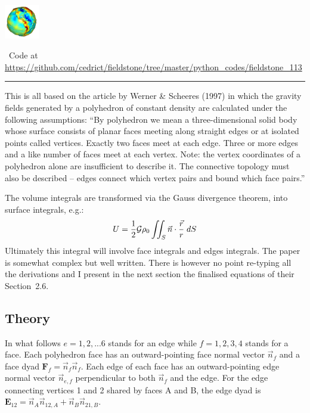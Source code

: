 
\includegraphics[height=1.5cm]{images/pictograms/gravity}



\begin{center}
\inpython~Code at \url{https://github.com/cedrict/fieldstone/tree/master/python_codes/fieldstone_113}
\end{center}

\par\noindent\rule{\textwidth}{0.4pt}



This is all based on the article by Werner \& Scheeres (1997) \cite{wesc97} in which 
the gravity fields generated by a polyhedron 
of constant density are calculated under the following assumptions:
``By polyhedron we mean a three-dimensional solid body whose surface consists of planar faces 
meeting along straight edges or at isolated points called vertices. Exactly two faces meet 
at each edge. Three or more edges and a like number of faces meet at each vertex. Note: 
the vertex coordinates of a polyhedron alone are insufficient to describe it. The connective 
topology must also be described -- edges connect which vertex pairs and bound which face pairs.''

The volume integrals are transformed via the Gauss divergence theorem, into surface integrals, e.g.:
\[
U = \frac12 {\cal G} \rho_0 \iint_S \vec{n} \cdot \frac{\vec{r}}{r} \; dS
\]
Ultimately this integral will involve face integrals and edges integrals.
The paper is somewhat complex but well written. There is however no point re-typing all the derivations and I present in the next section the finalised equations of their Section~2.6.


\subsection*{Theory}


In what follows $e=1,2,...6$ stands for an edge while $f=1,2,3,4$ stands
for a face. 
Each polyhedron face has an outward-pointing face normal vector $\vec{n}_f$
and a face dyad ${\bm F}_f =\vec{n}_f\vec{n}_f $.
Each edge of each face has an outward-pointing edge normal
vector $\vec{n}_{e,f}$ perpendicular to both $\vec{n}_f$ and the edge.
For the edge connecting vertices 1 and 2 shared by faces A and B,
the edge dyad is ${\bm E}_{12}=\vec{n}_A \vec{n}_{12,A}+\vec{n}_B \vec{n}_{21,B}$.

